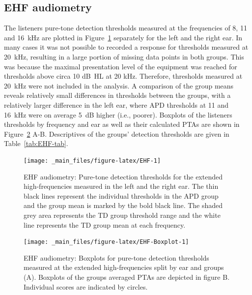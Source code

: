 \documentclass[a4paper, twoside]{templates/ociamthesis}
\begin{document}
\hypertarget{ehf-audiometry}{%
\subsection{EHF audiometry}\label{ehf-audiometry}}

The listeners pure-tone detection thresholds measured at the frequencies of 8, 11 and 16~kHz are plotted in Figure~\ref{fig:EHF} separately for the left and the right ear. In many cases it was not possible to recorded a response for thresholds measured at 20~kHz, resulting in a large portion of missing data points in both groups. This was because the maximal presentation level of the equipment was reached for thresholds above circa 10 dB~HL at 20 kHz. Therefore, thresholds measured at 20~kHz were not included in the analysis. A comparison of the group means reveals relatively small differences in thresholds between the groups, with a relatively larger difference in the left ear, where APD thresholds at 11 and 16~kHz were on average 5~dB higher (i.e., poorer). Boxplots of the listeners thresholds by frequency and ear as well as their calculated PTAs are shown in Figure~\ref{fig:EHF-Boxplot} A-B. Descriptives of the groups' detection thresholds are given in Table~\ref{tab:EHF-tab}.\\

\begin{figure}

{\centering \texttt{[image: \_main\_files/figure-latex/EHF-1]} 

}

\caption{EHF audiometry: Pure-tone detection thresholds for the extended high-frequencies measured in the left and the right ear. The thin black lines represent the individual thresholds in the APD group and the group mean is marked by the bold black line. The shaded grey area represents the TD group threshold range and the white line represents the TD group mean at each frequency.}\label{fig:EHF}
\end{figure}

\begin{figure}

{\centering \texttt{[image: \_main\_files/figure-latex/EHF-Boxplot-1]} 

}

\caption{EHF audiometry: Boxplots for pure-tone detection thresholds measured at the extended high-frequencies split by ear and groups (A). Boxplots of the groups averaged PTAs are depicted in figure B. Individual scores are indicated by circles.}\label{fig:EHF-Boxplot}
\end{figure}
\end{document}
